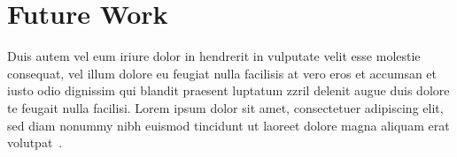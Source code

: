 \documentclass[journal]{vgtc}                %
\begin{document}
\section{Future Work}

Duis autem vel eum iriure dolor in hendrerit in vulputate velit esse
molestie consequat, vel illum dolore eu feugiat nulla facilisis at
vero eros et accumsan et iusto odio dignissim qui blandit praesent
luptatum zzril delenit augue duis dolore te feugait nulla
facilisi. Lorem ipsum dolor sit amet, consectetuer adipiscing elit,
sed diam nonummy nibh euismod tincidunt ut laoreet dolore magna
aliquam erat volutpat~\cite{Kindlmann:1999:SAG}.



%

%
%
%


\end{document}
